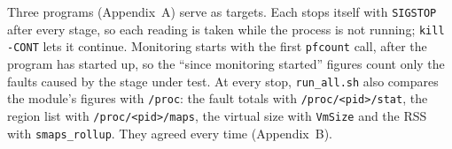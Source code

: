 Three programs (Appendix~A) serve as targets. Each stops itself with
\texttt{SIGSTOP} after every stage, so each reading is taken while the
process is not running; \texttt{kill -CONT} lets it continue. Monitoring
starts with the first \texttt{pfcount} call, after the program has started
up, so the ``since monitoring started'' figures count only the faults caused
by the stage under test. At every stop, \texttt{run\_all.sh} also compares the
module's figures with \texttt{/proc}: the fault totals with
\texttt{/proc/<pid>/stat}, the region list with \texttt{/proc/<pid>/maps}, the
virtual size with \texttt{VmSize} and the RSS with \texttt{smaps\_rollup}.
They agreed every time (Appendix~B).
